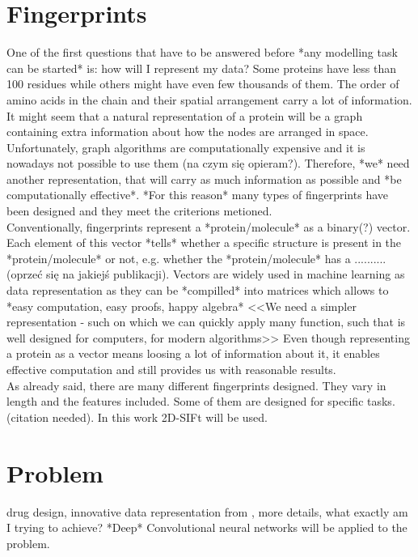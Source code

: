 \documentclass[a4paper,10pt]{report}
\begin{document}
    \section{Fingerprints} %
    One of the first questions that have to be answered before *any modelling task can be started* is: how will I represent my data? Some proteins have less than 100 residues while others might have even few thousands of them. The order of amino acids in the chain and their spatial arrangement carry a lot of information. It might seem that a natural representation of a protein will be a graph containing extra information about how the nodes are arranged in space. Unfortunately, graph algorithms are computationally expensive and it is nowadays not possible to use them (na czym się opieram?). Therefore, *we* need another representation, that will carry as much information as possible and *be computationally effective*. *For this reason* many types of fingerprints have been designed and they meet the criterions metioned.\\
    
    Conventionally, fingerprints represent a *protein/molecule* as a binary(?) vector. Each element of this vector *tells* whether a specific structure is present in the *protein/molecule* or not, e.g. whether the *protein/molecule* has a .......... (oprzeć się na jakiejś publikacji). Vectors are widely used in machine learning as data representation as they can be *compilled* into matrices which allows to *easy computation, easy proofs, happy algebra* <<We need a simpler representation - such on which we can quickly apply many function, such that is well designed for computers, for modern algorithms>> Even though representing a protein as a vector means loosing a lot of information about it, it enables effective computation and still provides us with reasonable results.\\
    
    As already said, there are many different fingerprints designed. They vary in length and the features included. Some of them are designed for specific tasks. (citation needed). In this work 2D-SIFt will be used.\\
  
    \section{Problem} %
    drug design, innovative data representation from \cite{2DSIFT}, more details, what exactly am I trying to achieve? *Deep* Convolutional neural networks will be applied to the problem.
    
\end{document}
